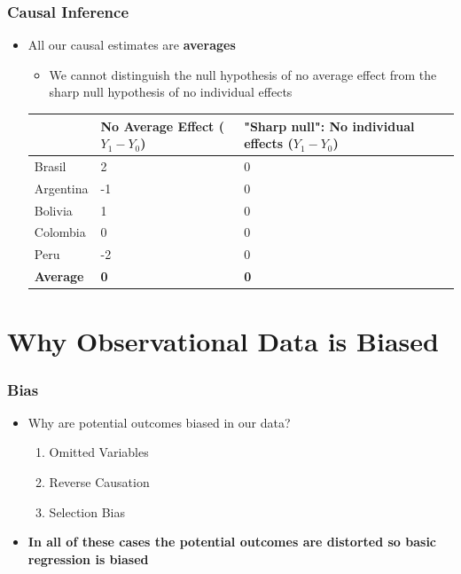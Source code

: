 \documentclass[xcolor=x11names,compress]{beamer}\usepackage[]{graphicx}\usepackage[]{color}
\renewcommand{\(}{\begin{columns}}
\renewcommand{\)}{\end{columns}}
\newcommand{\<}[1]{\begin{column}{#1}}
\renewcommand{\>}{\end{column}}
\begin{document}
\begin{frame}
\frametitle{Causal Inference}
\begin{itemize}
\item All our causal estimates are \textbf{averages}
\begin{itemize}
\item We cannot distinguish the null hypothesis of no average effect from the sharp null hypothesis of no individual effects
\end{itemize}
\footnotesize
\begin{table}[htbp]
  \centering
    \begin{tabular}{|l|p{3cm}|p{3cm}|}
    \hline
          & \multicolumn{1}{p{3cm}|}{No Average Effect ($Y_1-Y_0$)} & \multicolumn{1}{p{3cm}|}{"Sharp null": No individual effects ($Y_1-Y_0$)} \bigstrut\\
    \hline
    Brasil & 2     & 0 \bigstrut\\
    \hline
    Argentina & -1    & 0 \bigstrut\\
    \hline
    Bolivia & 1     & 0 \bigstrut\\
    \hline
    Colombia & 0     & 0 \bigstrut\\
    \hline
    Peru  & -2    & 0 \bigstrut\\
    \hline
    \textbf{Average} & \textbf{0}     & \textbf{0} \bigstrut\\
    \hline
    \end{tabular}%
  \label{tab:addlabel}%
\end{table}%
\normalsize
\end{itemize}
\end{frame}

\section{Why Observational Data is Biased}

\begin{frame}
\frametitle{Bias}
\begin{itemize}
\item Why are potential outcomes biased in our data?
\begin{enumerate}
\item Omitted Variables
\item Reverse Causation
\item Selection Bias
\end{enumerate}
\item \textbf{In all of these cases the potential outcomes are distorted so basic regression is biased}
\end{itemize}
\end{frame}
\end{document}

